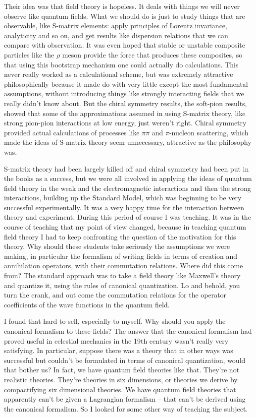 Their idea was that field theory is hopeless. It deals with things we will never observe like quantum fields. What we should do is just to study things that are observable, like  S-matrix elements: apply principles of Lorentz invariance, analyticity and so on, and get results like dispersion relations that we can  compare with observation.  It was even hoped that stable or unstable composite  particles like the $\rho$ meson  provide the force that produces these composites, so that using this bootstrap mechanism one could actually do calculations.  This never really worked as a calculational scheme, but was extremely attractive philosophically because it made do with very little except the most fundamental assumptions, without introducing things like strongly interacting fields that we really didn't know about. But the chiral symmetry results, the soft-pion results, showed that some of the approximations assumed in using S-matrix theory, like  strong  pion-pion interactions at low energy, just weren't right.  Chiral symmetry provided actual calculations of processes like $\pi\pi$ and $\pi$-nucleon scattering, which made the ideas of S-matrix theory seem unnecessary, attractive as the philosophy was.

S-matrix theory had been largely killed off and chiral symmetry had been put in the books as a success, but we were all involved in applying the ideas of quantum field theory in the weak and the electromagnetic interactions and then the strong interactions, building up the Standard Model, which was beginning to be very successful experimentally. It was a very happy time for the interaction between theory and experiment. During this period of course I was teaching.  It was in the course of teaching that my point of view changed, because in teaching quantum field theory  I had to keep confronting the question of the motivation for this theory. Why should these students take seriously the assumptions we were making, in particular the formalism of writing fields in terms of creation and annihilation operators, with their  commutation relations. Where did this come from?  The standard approach was to take a field theory like Maxwell's theory and  quantize it, using the rules of canonical quantization.  Lo and behold, you turn the crank, and out come the commutation relations for the operator coefficients of the  wave functions in the quantum field.

I found that hard to sell, especially to myself. Why should you apply the canonical formalism to these fields? The answer  that the canonical formalism  had proved useful in celestial mechanics in the 19th century wasn't really very satisfying.  In particular, suppose there was a theory that in other ways was successful but couldn't be formulated in terms of canonical quantization, would that bother us? In fact, we have quantum field theories like that. They're not realistic theories. They're theories in six dimensions, or theories we derive by compactifying six dimensional theories. We have quantum field theories that apparently can't be given a Lagrangian formalism -- that can't be derived using the canonical formalism. So I looked for some other way of teaching the subject.

